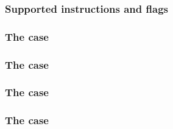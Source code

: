
\subsubsection{Supported instructions and flags}            \label{hub: instruction handling: halt: instruction flags}  
\subsubsection{The         case \lispDone{}}   \label{hub: instruction handling: halt: revert}             
\subsubsection{The         case \lispDone{}}   \label{hub: instruction handling: halt: return}             
\subsubsection{The           case \lispDone{}}   \label{hub: instruction handling: halt: stop}               
\subsubsection{The   case }   \label{hub: instruction handling: halt: selfdestruct}        %

